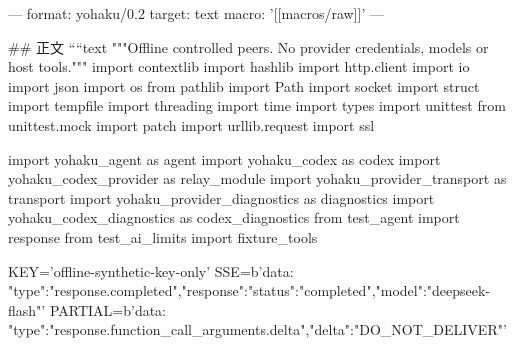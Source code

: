 ---
format: yohaku/0.2
target: text
macro: '[[macros/raw]]'
---

## 正文
````text
"""Offline controlled peers. No provider credentials, models or host tools."""
import contextlib
import hashlib
import http.client
import io
import json
import os
from pathlib import Path
import socket
import struct
import tempfile
import threading
import time
import types
import unittest
from unittest.mock import patch
import urllib.request
import ssl

import yohaku_agent as agent
import yohaku_codex as codex
import yohaku_codex_provider as relay_module
import yohaku_provider_transport as transport
import yohaku_provider_diagnostics as diagnostics
import yohaku_codex_diagnostics as codex_diagnostics
from test_agent import response
from test_ai_limits import fixture_tools

KEY='offline-synthetic-key-only'
SSE=b'data: {"type":"response.completed","response":{"status":"completed","model":"deepseek-flash"}}\n\n'
PARTIAL=b'data: {"type":"response.function_call_arguments.delta","delta":"DO_NOT_DELIVER"}\n\n'

